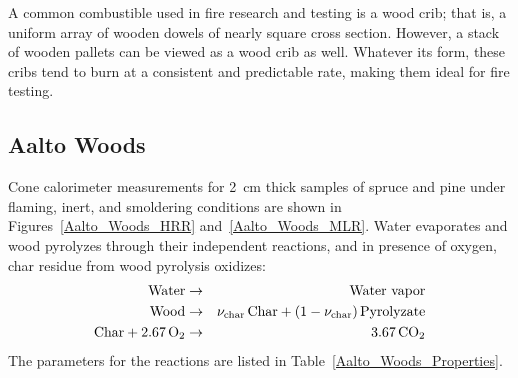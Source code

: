 A common combustible used in fire research and testing is a wood crib; that is, a uniform array of wooden dowels of nearly square cross section. However, a stack of wooden pallets can be viewed as a wood crib as well. Whatever its form, these cribs tend to burn at a consistent and predictable rate, making them ideal for fire testing.

\newpage

\subsection{Aalto Woods}
\label{Aalto_Woods_HRRPUA}

Cone calorimeter measurements for 2~cm thick samples of spruce and pine under flaming, inert, and smoldering conditions are shown in Figures~\ref{Aalto_Woods_HRR} and~\ref{Aalto_Woods_MLR}. Water evaporates and wood pyrolyzes through their independent reactions, and in presence of oxygen, char residue from wood pyrolysis oxidizes:
\begin{eqnarray}
   \hbox{Water} &\to& \hbox{Water vapor} \\
   \hbox{Wood} &\to& \nu_{\rm char} \, \hbox{Char} + (1-\nu_{\rm char}) \, \hbox{Pyrolyzate} \\
   \hbox{Char} + 2.67 \, \hbox{O}_2 &\to& 3.67 \, \hbox{CO}_2
\end{eqnarray}
The parameters for the reactions are listed in Table~\ref{Aalto_Woods_Properties}.

